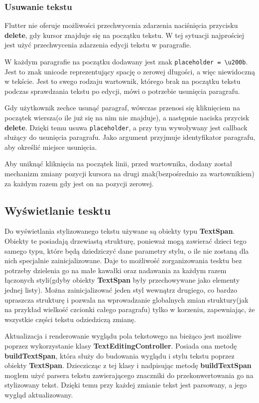 \subsubsection{Usuwanie tekstu}
\label{eq:usuwanieTekstu}

Flutter nie oferuje możliwości przechwycenia zdarzenia naciśnięcia przycisku \textbf{delete}, gdy kursor znajduje się na początku tekstu. W tej sytuacji najprościej jest użyć przechwycenia zdarzenia edycji tekstu w paragrafie.

W każdym paragrafie na początku dodawany jest znak \verb|placeholder = \u200b|. Jest to znak unicode reprezentujący spację o zerowej długości, a więc niewidoczną w tekście. Jest to swego rodzaju wartownik, którego brak na początku tekstu podczas sprawdzania tekstu po edycji, mówi o potrzebie usunięcia paragrafu.

Gdy użytkownik zechce usunąć paragraf, wówczas przenosi się kliknięciem na początek wiersza(o ile już się na nim nie znajduje), a następnie naciska przycisk \textbf{delete}. Dzięki temu usuwa \verb|placeholder|, a przy tym wywoływany jest callback służący do usunięcia paragrafu. Jako argument przyjmuje identyfikator paragrafu, aby określić miejsce usunięcia.

Aby uniknąć kliknięcia na początek linii, przed wartownika, dodany został mechanizm zmiany pozycji kursora na drugi znak(bezpośrednio za wartownikiem) za każdym razem gdy jest on na pozycji zerowej.

\subsection{Wyświetlanie tesktu}

Do wyświetlania stylizowanego tekstu używane są obiekty typu \textbf{TextSpan}. Obiekty te posiadają drzewiastą strukturę, ponieważ mogą zawierać dzieci tego samego typu, które będą dziedziczyć dane parametry stylu, o ile nie zostaną dla nich specjalnie zainicjalizowane. Daje to możliwość zorganizowania tesktu bez potrzeby dzielenia go na małe kawałki oraz nadawania za każdym razem łączonych styli(gdyby obiekty \textbf{TextSpan} były przechowywane jako elementy jednej listy). Można zainicjalizować jeden styl wewnątrz drugiego, co bardzo upraszcza strukturę i pozwala na wprowadzanie globalnych zmian struktury(jak na przykład wielkość czcionki całego paragrafu) tylko w korzeniu, zapewniając, że wszystkie części tekstu odziedziczą zmianę.

Aktualizacja i renderowanie wyglądu pola tekstowego na bieżąco jest możliwe poprzez wykorzystanie klasy \textbf{TextEditingController}. Posiada ona metodę \textbf{buildTextSpan}, która służy do budowania wyglądu i stylu tekstu poprzez obiekty \textbf{TextSpan}. Dzieczicząc z tej klasy i nadpisując metodę \textbf{buildTextSpan} mogłem użyć parsera tekstu zawierającego znaczniki do przekonwertowania go na stylizowany tekst.
Dzięki temu przy każdej zmianie tekst jest parsowany, a jego wygląd aktualizowany.

